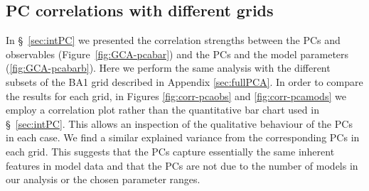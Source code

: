 \subsection{PC correlations with different grids}
\label{sec:PCAg}
In \S~\ref{sec:intPC}  we presented the correlation strengths between the PCs and observables (Figure~\ref{fig:GCA-pcabar}) and the PCs and the model parameters (\ref{fig:GCA-pcabarb}). 
 Here we perform the same analysis with the different subsets of the BA1 grid described in Appendix \ref{sec:fullPCA}. In order to compare the results for each grid, in Figures \ref{fig:corr-pcaobs} and \ref{fig:corr-pcamods} we employ a correlation plot rather than the quantitative bar chart used in \S~\ref{sec:intPC}. This allows an inspection of the qualitative behaviour of the PCs in each case. We find a similar explained variance from the corresponding PCs in each grid. This suggests that the PCs capture essentially the same inherent features in model data and that the PCs are not due to the number of models in our analysis or the chosen parameter ranges.

